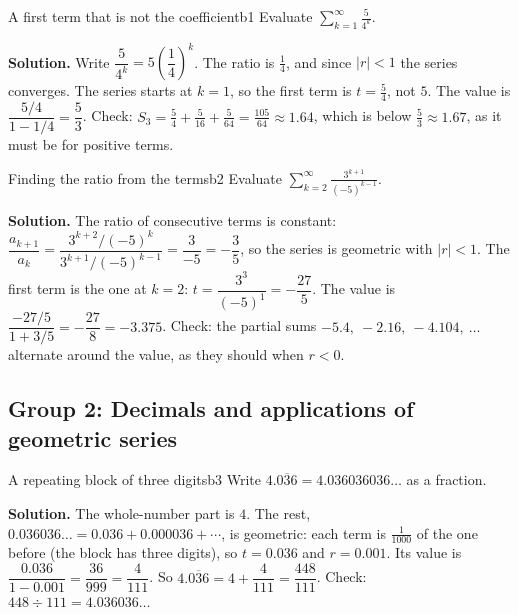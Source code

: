 \documentclass[11pt]{article}
\begin{document}
\begin{exmp}{A first term that is not the coefficient}{b1}
Evaluate $\displaystyle\sum_{k=1}^\infty\frac5{4^k}$.

\textbf{Solution.} Write $\dfrac5{4^k}=5\left(\dfrac14\right)^k$. The ratio is $\frac14$, and since $|r|<1$ the series converges. The series starts at $k=1$, so the first term is $t=\frac54$, not $5$. The value is $\dfrac{5/4}{1-1/4}=\dfrac53$. Check: $S_3=\frac54+\frac5{16}+\frac5{64}=\frac{105}{64}\approx1.64$, which is below $\frac53\approx1.67$, as it must be for positive terms.
\end{exmp}

\begin{exmp}{Finding the ratio from the terms}{b2}
Evaluate $\displaystyle\sum_{k=2}^\infty\frac{3^{k+1}}{(-5)^{k-1}}$.

\textbf{Solution.} The ratio of consecutive terms is constant: $\dfrac{a_{k+1}}{a_k}=\dfrac{3^{k+2}/(-5)^k}{3^{k+1}/(-5)^{k-1}}=\dfrac3{-5}=-\dfrac35$, so the series is geometric with $|r|<1$. The first term is the one at $k=2$: $t=\dfrac{3^3}{(-5)^1}=-\dfrac{27}5$. The value is $\dfrac{-27/5}{1+3/5}=-\dfrac{27}8=-3.375$. Check: the partial sums $-5.4,\ -2.16,\ -4.104,\ \dots$ alternate around the value, as they should when $r<0$.
\end{exmp}

\subsection*{Group 2: Decimals and applications of geometric series}

\begin{exmp}{A repeating block of three digits}{b3}
Write $4.\overline{036}=4.036036036\ldots$ as a fraction.

\textbf{Solution.} The whole-number part is $4$. The rest, $0.036036\ldots=0.036+0.000036+\cdots$, is geometric: each term is $\frac1{1000}$ of the one before (the block has three digits), so $t=0.036$ and $r=0.001$. Its value is $\dfrac{0.036}{1-0.001}=\dfrac{36}{999}=\dfrac4{111}$. So $4.\overline{036}=4+\dfrac4{111}=\dfrac{448}{111}$. Check: $448\div111=4.036036\ldots$
\end{exmp}
\end{document}
